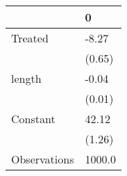\begin{tabular}{ll}
\toprule
{} &       0 \\
\midrule
Treated      &   -8.27 \\
             &  (0.65) \\
length       &   -0.04 \\
             &  (0.01) \\
Constant     &   42.12 \\
             &  (1.26) \\
Observations &  1000.0 \\
\bottomrule
\end{tabular}
